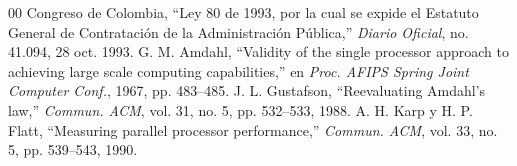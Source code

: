 \documentclass[conference]{IEEEtran}
\begin{document}
\begin{thebibliography}{00}
 Congreso de Colombia, ``Ley 80 de 1993, por la cual se expide el Estatuto General de Contratación de la Administración Pública,'' \textit{Diario Oficial}, no. 41.094, 28 oct. 1993.
 G. M. Amdahl, ``Validity of the single processor approach to achieving large scale computing capabilities,'' en \textit{Proc. AFIPS Spring Joint Computer Conf.}, 1967, pp. 483--485.
 J. L. Gustafson, ``Reevaluating Amdahl's law,'' \textit{Commun. ACM}, vol. 31, no. 5, pp. 532--533, 1988.
 A. H. Karp y H. P. Flatt, ``Measuring parallel processor performance,'' \textit{Commun. ACM}, vol. 33, no. 5, pp. 539--543, 1990.
\end{thebibliography}
\end{document}
